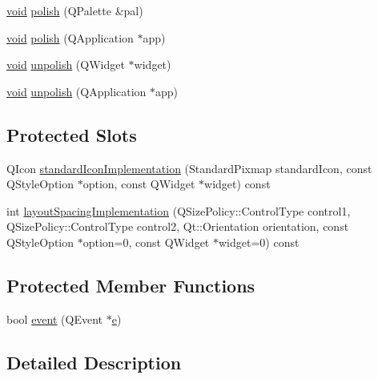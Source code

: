 \begin{DoxyCompactItemize}
\item 
\hyperlink{group___u_a_v_objects_plugin_ga444cf2ff3f0ecbe028adce838d373f5c}{void} \hyperlink{group___core_plugin_ga4ba18ac82b5981cd705a2db4abc674ee}{polish} (\-Q\-Palette \&pal)
\item 
\hyperlink{group___u_a_v_objects_plugin_ga444cf2ff3f0ecbe028adce838d373f5c}{void} \hyperlink{group___core_plugin_ga92648f0b5ff41cd6fc94ff98a84ecf37}{polish} (\-Q\-Application $\ast$app)
\item 
\hyperlink{group___u_a_v_objects_plugin_ga444cf2ff3f0ecbe028adce838d373f5c}{void} \hyperlink{group___core_plugin_gad6eebdec94a84337c3998d9533972323}{unpolish} (\-Q\-Widget $\ast$widget)
\item 
\hyperlink{group___u_a_v_objects_plugin_ga444cf2ff3f0ecbe028adce838d373f5c}{void} \hyperlink{group___core_plugin_gadcb93368b3bfbbc6746025b2d68e8dfe}{unpolish} (\-Q\-Application $\ast$app)
\end{DoxyCompactItemize}
\subsection*{\-Protected \-Slots}
\begin{DoxyCompactItemize}
\item 
\-Q\-Icon \hyperlink{group___core_plugin_ga391def9791426400daf51a02a5a58786}{standard\-Icon\-Implementation} (\-Standard\-Pixmap standard\-Icon, const \-Q\-Style\-Option $\ast$option, const \-Q\-Widget $\ast$widget) const 
\item 
int \hyperlink{group___core_plugin_gad167bd25b1d2b81313748886998fce7d}{layout\-Spacing\-Implementation} (\-Q\-Size\-Policy\-::\-Control\-Type control1, \-Q\-Size\-Policy\-::\-Control\-Type control2, \-Qt\-::\-Orientation orientation, const \-Q\-Style\-Option $\ast$option=0, const \-Q\-Widget $\ast$widget=0) const 
\end{DoxyCompactItemize}
\subsection*{\-Protected \-Member \-Functions}
\begin{DoxyCompactItemize}
\item 
bool \hyperlink{group___core_plugin_ga29cc9967198a03aa17cc33cf50d8a11e}{event} (\-Q\-Event $\ast$\hyperlink{_o_p_plots_8m_a9425be9aab51621e317ba7ade564b570}{e})
\end{DoxyCompactItemize}


\subsection{\-Detailed \-Description}


